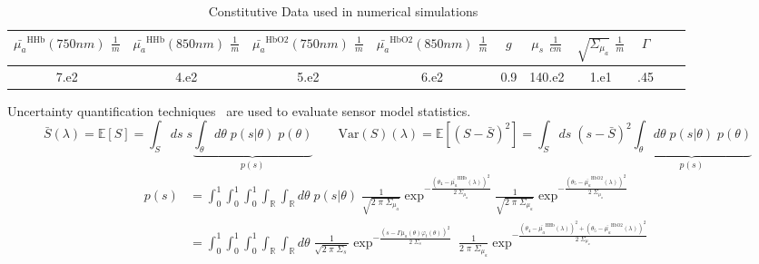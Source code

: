 \documentclass{article}         %
\theoremstyle{definition}
\theoremstyle{remark}
\begin{document}
\begin{table}[h]
\caption{
Constitutive
Data used in numerical
simulations~\cite{welch1984thermal,duck1990}}\label{modelparamaters}
\centering
\begin{tabular}{|c|c|c|c|c|c|c|c|c|c|} \hline
$\bar{\mu_a}^\text{HHb}(750nm) $ $ \frac{1}{ m }$ 
& 
$\bar{\mu_a}^\text{HHb}(850nm) $ $ \frac{1}{ m }$ 
& 
$\bar{\mu_a}^\text{HbO2}(750nm) $ $ \frac{1}{ m }$ 
& 
$\bar{\mu_a}^\text{HbO2}(850nm) $ $ \frac{1}{ m }$ 
& 
 $g$  &
$\mu_s$ $\frac{1}{cm}$  &  $\sqrt{\Sigma_{\mu_a}}$  $\frac{1}{m}$  
 &
$\Gamma$
\\ \hline
          7.e2              &             4.e2            & 5.e2  &
6.e2              &       0.9                  &  140.e2
&            1.e1                      &                  .45          \\
\hline
\end{tabular}
\end{table}

Uncertainty quantification
techniques~\cite{fahrenholtz2013generalised} are used to evaluate sensor
model statistics.
\[ 
   \bar{S}(\lambda)  = \mathbb{E}[S]   = \int_S   ds \; s
   \underbrace{\int_\theta  d\theta \; p(s|\theta) \; p(\theta)}_{p(s)}
  \qquad
   \text{Var}(S)(\lambda)   = 
   \mathbb{E}[ ( S - \bar{S} )^2 ]   = \int_S   ds \;(s - \bar{S})^2 
   \underbrace{\int_\theta  d\theta \; p(s|\theta) \; p(\theta)}_{p(s)}
\]
\[ \begin{split}
 p(s)  &= 
   \int_0^1
   \int_0^1
   \int_0^1
   \int_\mathbb{R}
   \int_\mathbb{R}
                d\theta \; p(s|\theta) \; 
       \frac{1}{ \sqrt{2\; \pi \; \Sigma_{\mu_a}}}
       \exp^{-\frac{(\theta_4 -\bar{\mu_a}^\text{HHb}(\lambda))^2}{2 \; \Sigma_{\mu_a}}}
       \frac{1}{ \sqrt{2\; \pi \; \Sigma_{\mu_a}}}
       \exp^{-\frac{(\theta_5 -\bar{\mu_a}^\text{HbO2}(\lambda))^2}{2 \; \Sigma_{\mu_a}}}
  \\
   & =
   \int_0^1
   \int_0^1
   \int_0^1
   \int_\mathbb{R}
   \int_\mathbb{R}
                d\theta \;
       \frac{1}{ \sqrt{2\; \pi \; \Sigma_s}}
       \exp^{-\frac{(s - \Gamma \mu_a(\theta) \varphi_t(\theta) )^2}{2 \; \Sigma_s}}
             \;
       \frac{1}{ 2\; \pi \; \Sigma_{\mu_a}}
       \exp^{-\frac{(\theta_4 -\bar{\mu_a}^\text{HHb}(\lambda))^2+(\theta_5 -\bar{\mu_a}^\text{HbO2}(\lambda))^2 }{2 \; \Sigma_{\mu_a}}}
\end{split}
\]
\end{document}
